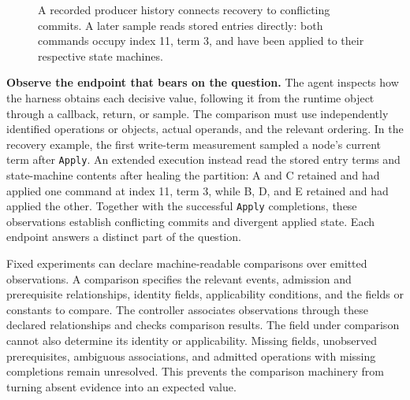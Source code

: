 \documentclass[10pt,twocolumn,letterpaper]{article}
\newcommand{\code}[1]{\texttt{#1}}
\begin{document}
\begin{figure}[t]
\centering
{}
\caption{A recorded producer history connects recovery to conflicting commits. A later sample reads stored entries directly: both commands occupy index 11, term 3, and have been applied to their respective state machines.}
\label{fig:case}
\end{figure}

\textbf{Observe the endpoint that bears on the question.}
The agent inspects how the harness obtains each decisive value, following it from the runtime object through a callback, return, or sample. The comparison must use independently identified operations or objects, actual operands, and the relevant ordering. In the recovery example, the first write-term measurement sampled a node's current term after \code{Apply}. An extended execution instead read the stored entry terms and state-machine contents after healing the partition: A and C retained and had applied one command at index 11, term 3, while B, D, and E retained and had applied the other. Together with the successful \code{Apply} completions, these observations establish conflicting commits and divergent applied state. Each endpoint answers a distinct part of the question.

Fixed experiments can declare machine-readable comparisons over emitted observations. A comparison specifies the relevant events, admission and prerequisite relationships, identity fields, applicability conditions, and the fields or constants to compare. The controller associates observations through these declared relationships and checks comparison results. The field under comparison cannot also determine its identity or applicability. Missing fields, unobserved prerequisites, ambiguous associations, and admitted operations with missing completions remain unresolved. This prevents the comparison machinery from turning absent evidence into an expected value.
\end{document}
